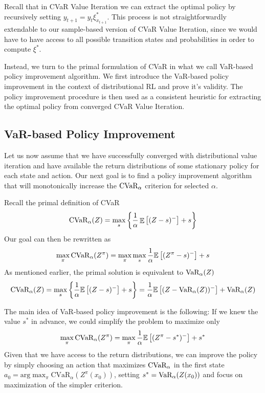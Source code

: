 Recall that in CVaR Value Iteration we can extract the optimal policy by recursively setting $y_{t+1}=y_t \xi^*_{x_{t+1}}$. This process is not straightforwardly extendable to our sample-based version of CVaR Value Iteration, since we would have to have access to all possible transition states and probabilities in order to compute $\xi^*$.

Instead, we turn to the primal formulation of CVaR in what we call VaR-based policy improvement algorithm. We first introduce the VaR-based policy improvement in the context of distributional RL and prove it's validity. The policy improvement procedure is then used as a consistent heuristic for extracting the optimal policy from converged CVaR Value Iteration.


\subsection{VaR-based Policy Improvement}

Let us now assume that we have successfully converged with distributional value iteration and have available the return distributions of some stationary policy for each state and action. Our next goal is to find a policy improvement algorithm that will monotonically increase the $\text{CVaR}_\alpha$ criterion for selected $\alpha$.

Recall the primal definition of CVaR 
\begin{equation*}
\text{CVaR}_\alpha(Z)=
\max_s\left\lbrace \dfrac{1}{\alpha}\mathop{\mathbb{E}}
\left[ (Z-s)^-\right] + s  \right\rbrace 
\end{equation*}
Our goal  can then be rewritten as
\begin{equation*}
\max_\pi \text{CVaR}_\alpha(Z^\pi) = \max_\pi \max_s \dfrac{1}{\alpha}\mathbb{E}
\left[ (Z^\pi-s)^-\right] + s
\end{equation*}
As mentioned earlier, the primal solution is equivalent to $\text{VaR}_\alpha(Z)$
\begin{equation*}
\text{CVaR}_\alpha(Z)=
\max_s\left\lbrace \dfrac{1}{\alpha}\mathbb{E}
\left[ (Z-s)^-\right] + s  \right\rbrace =\dfrac{1}{\alpha}\mathbb{E}
\left[ (Z - \text{VaR}_\alpha(Z))^-\right] + \text{VaR}_\alpha(Z) 
\end{equation*}

The main idea of VaR-based policy improvement is the following: If we knew the value $s^*$ in advance, we could simplify the problem to maximize only
\begin{equation}\label{eqn:varbasedgoal}
\max_\pi \text{CVaR}_\alpha(Z^\pi) = \max_\pi \dfrac{1}{\alpha}\mathbb{E}
\left[ (Z^\pi-s^*)^-\right] + s^*
\end{equation}
Given that we have access to the return distributions, we can improve the policy by simply choosing an action that maximizes $\text{CVaR}_\alpha$ in the first state $a_0 = \text{arg}\max_\pi\text{CVaR}_\alpha(Z^\pi(x_0))$, setting $s^* = \text{VaR}_\alpha(Z(x_0))$ and focus on maximization of the simpler criterion.

